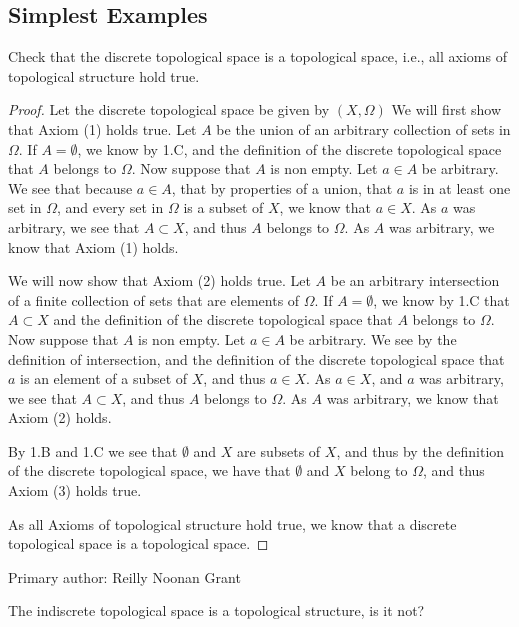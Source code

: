 \subsection{Simplest Examples}

\begin{majorEx} %
    Check that the discrete topological space is a topological space, i.e., all
    axioms of topological structure hold true.
\end{majorEx}

\begin{proof}
  Let the discrete topological space be given by $(X, \Omega)$
  We will first show that Axiom (1) holds true. Let $A$ be the union
  of an arbitrary collection of sets in $\Omega$.  If $A = \emptyset$, 
  we know by 1.C, and the definition of the discrete topological space
  that $A$ belongs to $\Omega$. Now suppose that $A$ is non 
  empty. Let $a\in A$  be arbitrary. We see that because $a\in A$,
  that by properties of a
  union, that $a$ is in at least one set in $\Omega$, and every set in
  $\Omega$ is a subset of $X$, we know that $a \in X$. As $a$ was
  arbitrary, we see that $A \subset X$, and thus $A$ belongs to
  $\Omega$. As $A$ was arbitrary, we know that Axiom (1) holds.
  

  We will now show that Axiom (2) holds true. Let $A$ be an arbitrary
  intersection of a finite collection of sets that are elements of
  $\Omega$. If $A = \emptyset$, we know by 1.C that $A \subset X$ 
  and the definition of the discrete topological space that $A$ 
  belongs to $\Omega$. Now suppose that $A$ is non empty.
  Let  $a\in A$ be arbitrary. We see by the definition of
  intersection, and the definition of the discrete topological space
  that $a$ is an element of a subset of $X$, and thus $a \in X$. As $a
  \in X$, and $a$ was arbitrary, we see that $A \subset X$, and thus
  $A$ belongs to $\Omega$. As $A$ was arbitrary, we know that
  Axiom (2) holds.

  By 1.B and 1.C we see that $\emptyset$ and $X$ are subsets of $X$,
  and thus by the definition of the discrete topological space, we
  have that $\emptyset$ and $X$ belong to $\Omega$, and thus Axiom (3)
  holds true.

  As all Axioms of topological structure hold true, we know 
  that a discrete topological space is a topological space.
\end{proof}

Primary author: Reilly Noonan Grant

\begin{majorEx} %
    The indiscrete topological space is a topological structure, is it not?
\end{majorEx}

